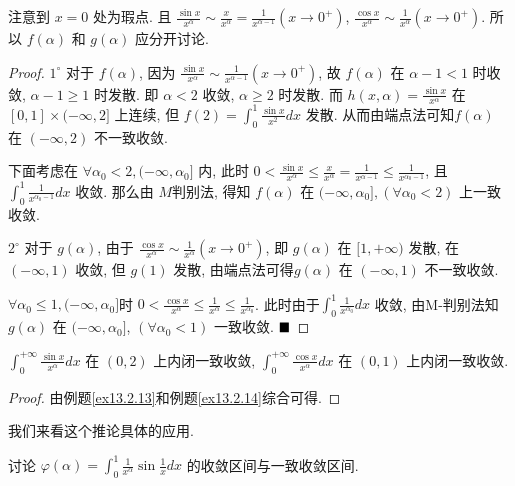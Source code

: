 \documentclass[lang=cn,newtx,10pt,scheme=chinese]{elegantbook}
\begin{document}
\begin{remark}
    注意到 $x=0$ 处为瑕点. 且 $\frac{\sin x}{x^{\alpha}} \sim \frac{x}{x^{\alpha}} = \frac{1}{x^{\alpha-1}} (x \to 0^+)$, $\frac{\cos x}{x^{\alpha}} \sim \frac{1}{x^{\alpha}} (x \to 0^+)$.
所以 $f(\alpha)$ 和 $g(\alpha)$ 应分开讨论.
\end{remark}
\begin{proof}


$1^{\circ}$ 对于 $f(\alpha)$, 因为 $\frac{\sin x}{x^{\alpha}} \sim \frac{1}{x^{\alpha-1}} (x \to 0^+)$, 故 $f(\alpha)$ 在 $\alpha-1 < 1$ 时收敛, $\alpha-1 \ge 1$ 时发散. 即 $\alpha < 2$ 收敛, $\alpha \ge 2$ 时发散. 而 $h(x,\alpha) = \frac{\sin x}{x^{\alpha}}$ 在 $[0,1] \times (-\infty, 2]$ 上连续, 但 $f(2) = \int_{0}^{1} \frac{\sin x}{x^2} dx$ 发散. 从而由端点法可知$f(\alpha)$ 在 $(-\infty, 2)$ 不一致收敛.

下面考虑在 $\forall \alpha_0 < 2,(-\infty, \alpha_0]$ 内, 此时 $0 < \frac{\sin x}{x^{\alpha}} \le \frac{x}{x^{\alpha}} = \frac{1}{x^{\alpha-1}} \le \frac{1}{x^{\alpha_0-1}}$, 且 $\int_{0}^{1} \frac{1}{x^{\alpha_0-1}} dx$ 收敛.
那么由 $M$判别法, 得知 $f(\alpha)$ 在 $(-\infty, \alpha_0],(\forall \alpha_0 < 2)$ 上一致收敛.

$2^{\circ}$ 对于 $g(\alpha)$, 由于 $\frac{\cos x}{x^{\alpha}} \sim \frac{1}{x^{\alpha}} (x \to 0^+)$, 即 $g(\alpha)$ 在 $[1, +\infty)$ 发散, 在 $(-\infty, 1)$ 收敛, 但 $g(1)$ 发散, 由端点法可得$g(\alpha)$ 在 $(-\infty, 1)$ 不一致收敛.

$\forall  \alpha_0 \le 1,(-\infty, \alpha_0]$时 $0 < \frac{\cos x}{x^{\alpha}} \le \frac{1}{x^{\alpha}} \le \frac{1}{x^{\alpha_0}}$. 此时由于$\int_{0}^{1} \frac{1}{x^{\alpha_0}} dx$ 收敛, 由M-判别法知 $g(\alpha)$ 在 $(-\infty, \alpha_0]$, $(\forall \alpha_0 < 1)$ 一致收敛.
$\hfill \blacksquare$
\end{proof}

\begin{corollary}\label{ex13.2.14_corollary}
$\int_{0}^{+\infty} \frac{\sin x}{x^{\alpha}} dx$ 在 $(0, 2)$ 上内闭一致收敛, $\int_{0}^{+\infty} \frac{\cos x}{x^{\alpha}} dx$ 在 $(0, 1)$ 上内闭一致收敛.
\end{corollary}

\begin{proof}
    由例题\ref{ex13.2.13}和例题\ref{ex13.2.14}综合可得.
\end{proof}

我们来看这个推论具体的应用.

\begin{example}
讨论 $\varphi(\alpha) = \int_{0}^{1} \frac{1}{x^\alpha} \sin \frac{1}{x} dx$ 的收敛区间与一致收敛区间.
\end{example}
\end{document}
